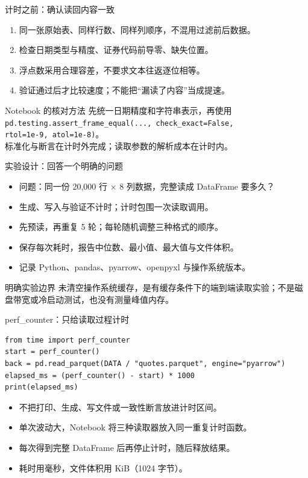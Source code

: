 \documentclass[9pt]{ctexbeamer}
\begin{document}
\begin{frame}{计时之前：确认读回内容一致}
\begin{enumerate}
\item 同一张原始表、同样行数、同样列顺序，不混用过滤前后数据。
\item 检查日期类型与精度、证券代码前导零、缺失位置。
\item 浮点数采用合理容差，不要求文本往返逐位相等。
\item 验证通过后才比较速度；不能把“漏读了内容”当成提速。
\end{enumerate}
\begin{block}{Notebook 的核对方法}
先统一日期精度和字符串表示，再使用\\
\texttt{pd.testing.assert\_frame\_equal(..., check\_exact=False,}\\
\texttt{rtol=1e-9, atol=1e-8)}。\\
标准化与断言在计时外完成；读取参数的解析成本在计时内。
\end{block}
\end{frame}

\begin{frame}{实验设计：回答一个明确的问题}
\begin{itemize}
\item 问题：同一份 20,000 行 $\times$ 8 列数据，完整读成 DataFrame 要多久？
\item 生成、写入与验证不计时；计时包围一次读取调用。
\item 先预读，再重复 5 轮；每轮随机调整三种格式的顺序。
\item 保存每次耗时，报告中位数、最小值、最大值与文件体积。
\item 记录 Python、pandas、pyarrow、openpyxl 与操作系统版本。
\end{itemize}
\begin{alertblock}{明确实验边界}
未清空操作系统缓存，是有缓存条件下的端到端读取实验；不是磁盘带宽或冷启动测试，也没有测量峰值内存。
\end{alertblock}
\end{frame}

\begin{frame}[fragile]{perf\_counter：只给读取过程计时}
\begin{lstlisting}
from time import perf_counter
start = perf_counter()
back = pd.read_parquet(DATA / "quotes.parquet", engine="pyarrow")
elapsed_ms = (perf_counter() - start) * 1000
print(elapsed_ms)
\end{lstlisting}
\begin{itemize}
\item 不把打印、生成、写文件或一致性断言放进计时区间。
\item 单次波动大，Notebook 将三种读取器放入同一重复计时函数。
\item 每次得到完整 DataFrame 后再停止计时，随后释放结果。
\item 耗时用毫秒，文件体积用 KiB（1024 字节）。
\end{itemize}
\end{frame}
\end{document}

